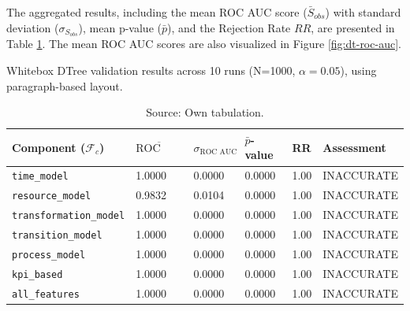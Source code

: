 The aggregated results, including the mean ROC AUC score ($\bar{S}_{obs}$) with standard deviation ($\sigma_{S_{obs}}$), mean p-value ($\bar{p}$), and the Rejection Rate $RR$, are presented in Table \ref{tab:results-whitebox}. The mean ROC AUC scores are also visualized in Figure \ref{fig:dt-roc-auc}.

\begin{table}[htbp]
  \centering
  \caption[Whitebox model results]{Whitebox DTree validation results across 10 runs (N=1000, $\alpha=0.05$), using paragraph-based layout.}
  \label{tab:results-whitebox}
  \begin{tabular}{l l l l l p{3cm}}
    \toprule
    \textbf{Component ($\mathcal{F}_c$)} & \textbf{$\overline{\text{ROC AUC}}$} & \textbf{$\sigma_{\text{ROC AUC}}$} & \textbf{$\bar{p}$-value} & \textbf{RR} & \textbf{Assessment} \\
    \midrule
    \texttt{time\_model}                 & 1.0000                               & 0.0000                             & 0.0000                   & 1.00        & INACCURATE          \\
    \texttt{resource\_model}             & 0.9832                               & 0.0104                             & 0.0000                   & 1.00        & INACCURATE          \\
    \texttt{transformation\_model}       & 1.0000                               & 0.0000                             & 0.0000                   & 1.00        & INACCURATE          \\
    \texttt{transition\_model}           & 1.0000                               & 0.0000                             & 0.0000                   & 1.00        & INACCURATE          \\
    \texttt{process\_model}              & 1.0000                               & 0.0000                             & 0.0000                   & 1.00        & INACCURATE          \\
    \texttt{kpi\_based}                  & 1.0000                               & 0.0000                             & 0.0000                   & 1.00        & INACCURATE          \\
    \texttt{all\_features}               & 1.0000                               & 0.0000                             & 0.0000                   & 1.00        & INACCURATE          \\
    \bottomrule
  \end{tabular}
  \caption*{Source: Own tabulation.}
\end{table}


